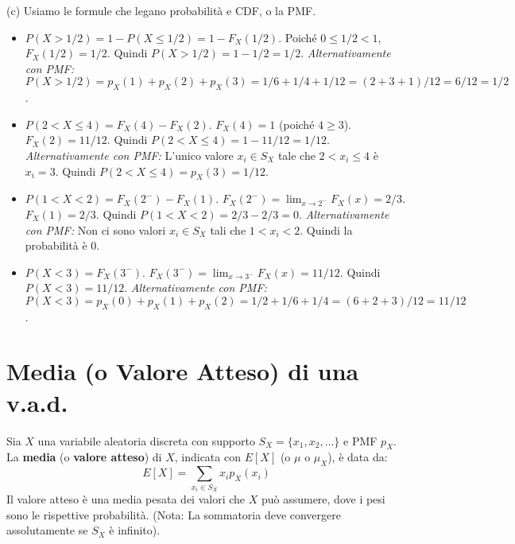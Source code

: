 \begin{example}
(c) Usiamo le formule che legano probabilità e CDF, o la PMF.
    \begin{itemize}
        \item $P(X > 1/2) = 1 - P(X \le 1/2) = 1 - F_X(1/2)$. Poiché $0 \le 1/2 < 1$, $F_X(1/2) = 1/2$.
        Quindi $P(X > 1/2) = 1 - 1/2 = 1/2$.
        \textit{Alternativamente con PMF:} $P(X > 1/2) = p_X(1) + p_X(2) + p_X(3) = 1/6 + 1/4 + 1/12 = (2+3+1)/12 = 6/12 = 1/2$.
        
        \item $P(2 < X \le 4) = F_X(4) - F_X(2)$.
        $F_X(4) = 1$ (poiché $4 \ge 3$). $F_X(2) = 11/12$.
        Quindi $P(2 < X \le 4) = 1 - 11/12 = 1/12$.
        \textit{Alternativamente con PMF:} L'unico valore $x_i \in S_X$ tale che $2 < x_i \le 4$ è $x_i=3$.
        Quindi $P(2 < X \le 4) = p_X(3) = 1/12$.

        \item $P(1 < X < 2) = F_X(2^-) - F_X(1)$.
        $F_X(2^-) = \lim_{x \to 2^-} F_X(x) = 2/3$. $F_X(1) = 2/3$.
        Quindi $P(1 < X < 2) = 2/3 - 2/3 = 0$.
        \textit{Alternativamente con PMF:} Non ci sono valori $x_i \in S_X$ tali che $1 < x_i < 2$. Quindi la probabilità è 0.
        
        \item $P(X < 3) = F_X(3^-)$.
        $F_X(3^-) = \lim_{x \to 3^-} F_X(x) = 11/12$.
        Quindi $P(X < 3) = 11/12$.
        \textit{Alternativamente con PMF:} $P(X < 3) = p_X(0) + p_X(1) + p_X(2) = 1/2 + 1/6 + 1/4 = (6+2+3)/12 = 11/12$.
    \end{itemize}
\end{example}

\section{Media (o Valore Atteso) di una v.a.d.}
\begin{definition}
Sia $X$ una variabile aleatoria discreta con supporto $S_X = \{x_1, x_2, \dots\}$ e PMF $p_X$. La \textbf{media} (o \textbf{valore atteso}) di $X$, indicata con $E[X]$ (o $\mu$ o $\mu_X$), è data da:
\[ E[X] = \sum_{x_i \in S_X} x_i p_X(x_i) \]
Il valore atteso è una media pesata dei valori che $X$ può assumere, dove i pesi sono le rispettive probabilità.
(Nota: La sommatoria deve convergere assolutamente se $S_X$ è infinito).
\end{definition}

